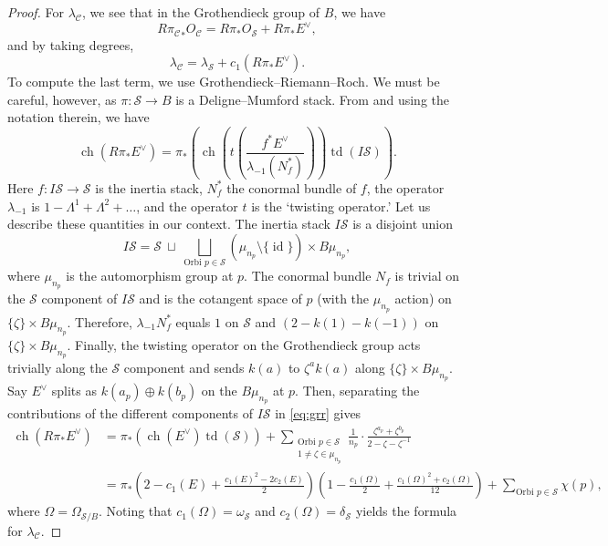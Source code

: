 \documentclass{amsart}
\newcommand {\from}{{\colon}}
\newcommand{\orb}[1]{{\mathcal #1}}     %
\newcommand{\dual}[1]{#1^{\vee}}
\DeclareMathOperator{\id}{id}
\DeclareMathOperator{\ch}{ch}
\DeclareMathOperator{\td}{td}
\begin{document}
\begin{proof}
For $\lambda_{\orb C}$, we see that in the Grothendieck group of $B$, we have
\[ R{\pi_{\orb C}}_*O_{\orb C} = R{\pi}_* O_{\orb S} + R{\pi}_* \dual E,\]
and by taking degrees, 
\[ \lambda_{\orb C} = \lambda_{\orb S} + c_1(R{\pi}_*\dual E).\]
To compute the last term, we use Grothendieck--Riemann--Roch. We must be careful, however, as $\pi \from \orb S \to B$ is a Deligne--Mumford stack. From \citep[Corollary~5.2]{edidin12:_rieman_roch_delig_mumfor} and using the notation therein, we have
\begin{equation}\label{eq:grr}
  \ch(R{\pi}_*\dual E) = \pi_*\left(\ch\left(t\left(\frac{f^*\dual E}{\lambda_{-1}(N^*_f)}\right)\right) \td(I\orb S)\right).
\end{equation}
Here $f \from I \orb S \to \orb S$ is the inertia stack, $N^*_f$ the conormal bundle of $f$, the operator $\lambda_{-1}$ is $1 - \Lambda^1 +  \Lambda^2 + \dots$, and the operator $t$ is the `twisting operator.' Let us describe these quantities in our context. The inertia stack $I\orb S$ is a disjoint union
\[ I \orb S = \orb S\ \sqcup\ \bigsqcup_{\text{Orbi }p \in \orb S} (\mu_{n_p} \setminus \{\id\}) \times B\mu_{n_p},\]
where $\mu_{n_p}$ is the automorphism group at $p$. The conormal bundle $N_f$ is trivial on the $\orb S$ component of $I\orb S$ and is the cotangent space of $p$ (with the $\mu_{n_p}$ action) on $\{\zeta\} \times B\mu_{n_p}$. Therefore, $\lambda_{-1}N^*_f$ equals $1$ on $\orb S$ and $(2-k(1)-k(-1))$ on $\{\zeta\} \times B{\mu_{n_p}}$. Finally, the twisting operator on the Grothendieck group acts trivially along the $\orb S$ component and sends $k(a)$ to $\zeta^a k(a)$ along $\{\zeta\} \times B{\mu_{n_p}}$. Say $\dual E$ splits as $k(a_p) \oplus k(b_p)$ on the $B\mu_{n_p}$ at $p$. Then, separating the contributions of the different components of $I\orb S$ in \eqref{eq:grr} gives
\begin{align*}
  \ch(R\pi_*\dual E) &= \pi_*\left(\ch(\dual E) \td(\orb S)\right) + \sum_{\substack{\text{Orbi }p \in \orb S\\ 1 \neq \zeta \in \mu_{n_p}}}  \frac{1}{n_p} \cdot \frac{\zeta^{a_p} +   \zeta^{b_p}}{2-\zeta-\zeta^{-1}}\\
  &= \pi_*\left(2-c_1(E)+\frac{c_1(E)^2-2c_2(E)}{2}\right)\left(1-\frac{c_1(\Omega)}{2} + \frac{c_1(\Omega)^2 + c_2(\Omega)}{12}\right) + \sum_{\text{Orbi } p \in \orb S} \chi(p),
\end{align*}
where $\Omega = \Omega_{\orb S/B}$. Noting that $c_1(\Omega) = \omega_{\orb S}$ and $c_2(\Omega) = \delta_{\orb S}$ yields the formula for $\lambda_{\orb C}$.
\end{proof}
\end{document}
